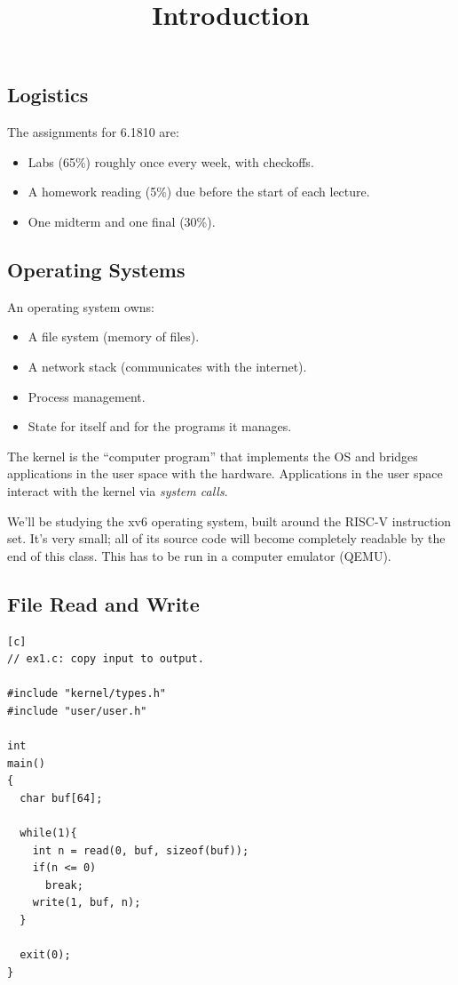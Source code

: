 \title{Introduction}



\subsection{Logistics}

The assignments for 6.1810 are:
\begin{itemize}
    \item Labs (65\%) roughly once every week, with checkoffs.
    \item A homework reading (5\%) due before the start of each lecture.
    \item One midterm and one final (30\%).
\end{itemize}

\subsection{Operating Systems}

An operating system owns:
\begin{itemize}
    \item A file system (memory of files).
    \item A network stack (communicates with the internet).
    \item Process management.
    \item State for itself and for the programs it manages.
\end{itemize}
The kernel is the ``computer program'' that implements the OS
and bridges applications in the user space with the hardware.
Applications in the user space interact with the kernel
via \emph{system calls}.

We'll be studying the xv6 operating system,
built around the RISC-V instruction set.
It's very small; all of its source code
will become completely readable by the end of this class.
This has to be run in a computer emulator (QEMU).

\subsection{File Read and Write}

\begin{verbatim}[c]
// ex1.c: copy input to output.

#include "kernel/types.h"
#include "user/user.h"

int
main()
{
  char buf[64];

  while(1){
    int n = read(0, buf, sizeof(buf));
    if(n <= 0)
      break;
    write(1, buf, n);
  }

  exit(0);
}
\end{verbatim}

